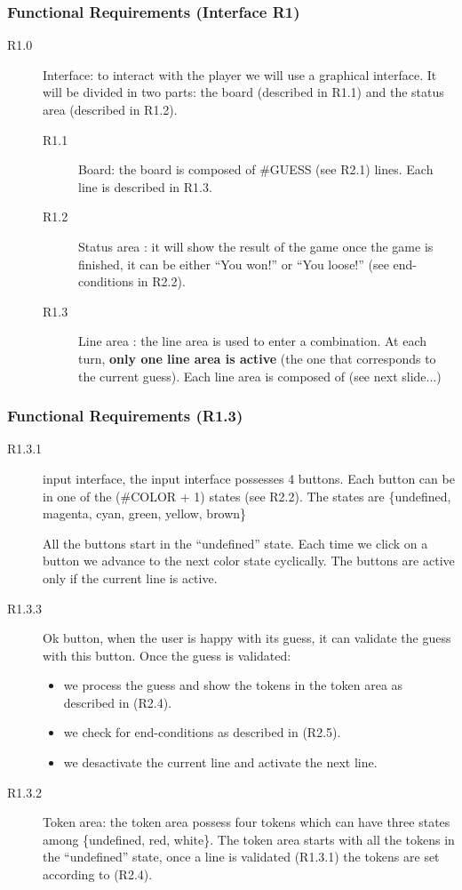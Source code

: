 \documentclass[10pt, handout]{beamer}
\begin{document}
\begin{frame}[shrinkr]
  \frametitle{Functional Requirements (Interface R1)}
  \begin{description}
  \item[R1.0] Interface: to interact with the player we will use a
    graphical interface. It will be divided in two parts: the
    board (described in R1.1) and the status area (described in R1.2).
    \begin{description}
    \item[R1.1] Board: the board is composed of \#GUESS (see R2.1)
      lines. Each line is described in R1.3.
    \item[R1.2] Status area : it will show the result
      of the game once the game is finished, it can be either ``You won!'' or
      ``You loose!'' (see end-conditions in R2.2).
    \item[R1.3] Line area : the line area is used to enter a combination.
      At each turn, \textbf{only one line area is active}
      (the one that corresponds to the current guess).
      Each line area is composed of (see next slide...)
    \end{description}
  \end{description}
\end{frame}
\begin{frame}[shrink]
  \frametitle{Functional Requirements (R1.3)}
    \begin{description}
    \item[R1.3.1] input interface, the input interface possesses
      4 buttons. Each button can be in one of the (\#COLOR + 1) states
      (see R2.2).
      The states are \{undefined, magenta, cyan, green,
                yellow, brown\}

      All the buttons start in the ``undefined'' state.
      Each time we click on a button we advance to the next color state
      cyclically.
      The buttons are active only if the current line is active.
    \item[R1.3.3] Ok button, when the user is happy with its guess, it
      can validate the guess with this button.
      Once the guess is validated:
      \begin{itemize}
        \item we process the guess and show the tokens in the token area
          as described in (R2.4).
        \item we check for end-conditions as described in (R2.5).
        \item we desactivate the current line and activate the next line.
      \end{itemize}
    \item[R1.3.2] Token area: the token area possess four tokens which
      can have three states among \{undefined, red, white\}.
      The token area starts with all the tokens in the ``undefined''
      state, once a line is validated (R1.3.1) the tokens are set
      according to (R2.4).
    \end{description}
\end{frame}
\end{document}
